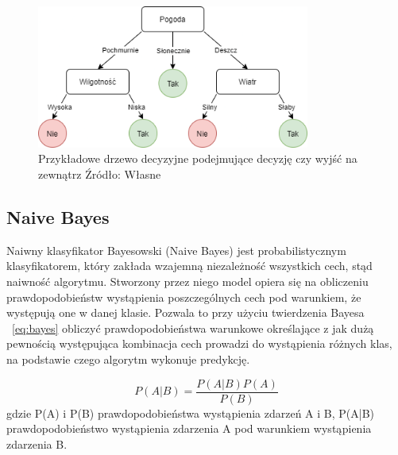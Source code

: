 \begin{figure}[h]
    \centering
    \includegraphics[width=0.8\textwidth]{./Img/BinaryTree.png}
    \caption{Przykładowe drzewo decyzyjne podejmujące decyzję czy wyjść na zewnątrz Źródło: Własne}
\end{figure}


\subsection{Naive Bayes}

Naiwny klasyfikator Bayesowski (Naive Bayes) jest probabilistycznym klasyfikatorem, który
zakłada wzajemną niezależność wszystkich cech, stąd naiwność algorytmu. Stworzony przez niego model
opiera się na obliczeniu prawdopodobieństw wystąpienia poszczególnych cech pod warunkiem, że 
występują one w danej klasie. Pozwala to przy użyciu twierdzenia Bayesa ~\ref{eq:bayes} obliczyć prawdopodobieństwa 
warunkowe określające z jak dużą pewnością występująca kombinacja cech prowadzi do 
wystąpienia różnych klas, na podstawie czego algorytm wykonuje predykcję. 


\begin{equation}
    \label{eq:bayes}
    P(A|B) = \frac{P(A|B)P(A)}{P(B)}
\end{equation}
gdzie P(A) i P(B) prawdopodobieństwa wystąpienia zdarzeń A i B, P(A|B) prawdopodobieństwo wystąpienia
zdarzenia A pod warunkiem wystąpienia zdarzenia B.

